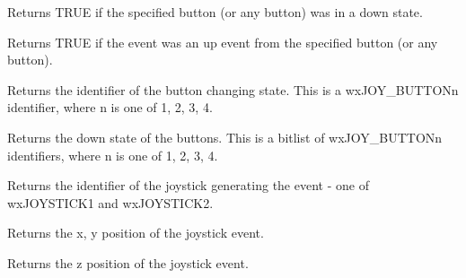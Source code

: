 Returns TRUE if the specified button (or any button) was in a down state.



\label{wxjoystickeventbuttonup}


Returns TRUE if the event was an up event from the specified button (or any button).



\label{wxjoystickeventgetbuttonchange}


Returns the identifier of the button changing state. This is a wxJOY\_BUTTONn identifier, where
n is one of 1, 2, 3, 4.

\label{wxjoystickeventgetbuttonstate}


Returns the down state of the buttons. This is a bitlist of wxJOY\_BUTTONn identifiers, where
n is one of 1, 2, 3, 4.

\label{wxjoystickeventgetjoystick}


Returns the identifier of the joystick generating the event - one of wxJOYSTICK1 and wxJOYSTICK2.

\label{wxjoystickeventgetposition}


Returns the x, y position of the joystick event.

\label{wxjoystickeventgetzposition}


Returns the z position of the joystick event.

\label{wxjoystickeventisbutton}

